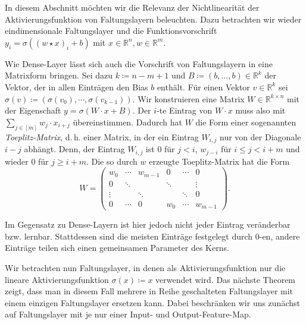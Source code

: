 \documentclass[paper=a4, 	%
		fontsize=11pt, 		%
		abstracton, 	%
		headsepline, 	%
		notitlepage	%
		]{scrartcl}
\theoremstyle{definition}
\newcommand{\R}{\mathbb{R}}
\newcommand{\fNat}[1]{[ #1 ]}
\begin{document}
In diesem Abschnitt möchten wir die Relevanz der Nichtlinearität der Aktivierungsfunktion von Faltungslayern beleuchten.
Dazu betrachten wir wieder eindimensionale Faltungslayer und die Funktionsvorschrift $y_i = \sigma( (w\star x)_i + b )$ mit $x\in\R^n, w\in\R^m$.

Wie Dense-Layer lässt sich auch die Vorschrift von Faltungslayern in eine Matrixform bringen.
Sei dazu $k\coloneqq n-m+1$ und $B\coloneqq (b, \dots, b)\in\R^k$ der Vektor, der in allen Einträgen den Bias $b$ enthält.
Für einen Vektor $v\in\R^k$ sei $\sigma(v) \coloneqq (\sigma(v_0), \cdots, \sigma(v_{k-1}))$.
Wir konstruieren eine Matrix $W\in\R^{k\times n}$ mit der Eigenschaft $y = \sigma( W\cdot x + B )$.
Der $i$-te Eintrag von $W\cdot x$ muss also mit $\sum_{j\in\fNat{m}} w_j \cdot x_{i+j}$
übereinstimmen.
Dadurch hat $W$ die Form einer sogenannten \emph{Toeplitz-Matrix}, d.\,h. einer Matrix, in der ein Eintrag $W_{i,j}$ nur von der Diagonale $i-j$ abhängt.
Denn, der Eintrag $W_{i,j}$ ist $0$ für $j < i$, $w_{j-i}$ für $i \leq j < i+m$ und wieder $0$ für $j \geq i+m$.
Die so durch $w$ erzeugte Toeplitz-Matrix hat die Form
\[
    W = \begin{pmatrix}
            w_0 & \cdots & w_{m-1} & 0 & \cdots & 0 \\
            0 & \ddots & & \ddots  & & \vdots \\
            \vdots  & & \ddots & & \ddots & 0 \\[4pt]
             0 & \cdots & 0 & w_0 & \cdots & w_{m-1}
        \end{pmatrix}.
\]

Im Gegensatz zu Dense-Layern ist hier jedoch nicht jeder Eintrag veränderbar bzw. lernbar.
Stattdessen sind die meisten Einträge festgelegt durch $0$-en, andere Einträge teilen sich einen gemeinsamen Parameter des Kerns.

Wir betrachten nun Faltungslayer, in denen als Aktivierungsfunktion nur die lineare Aktivierungsfunktion $\sigma(x) \coloneqq x$ verwendet wird.
Das nächste Theorem zeigt, dass man in diesem Fall mehrere in Reihe geschalteten Faltungslayer mit einem einzigen Faltungslayer ersetzen kann.
Dabei beschränken wir uns zunächst auf Faltungslayer mit je nur einer Input- und Output-Feature-Map.
\end{document}
